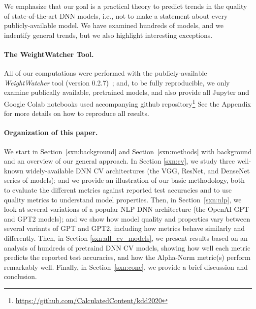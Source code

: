 \noindent
We emphasize that our goal is a practical theory to predict trends in the quality of state-of-the-art DNN models, i.e., not to make a statement about every publicly-available model.
We have examined hundreds of models, and we indentify general trends, but we also highlight interesting exceptions.

\paragraph{The WeightWatcher Tool.}

All of our computations were performed with the publicly-available \emph{WeightWatcher} tool (version 0.2.7)~\cite{weightwatcher_package};
and, to be fully reproducible, we only examine publically available, pretrained models, and
also provide all Jupyter and Google Colab notebooks used accompanying github 
repository\footnote{\url{https://github.com/CalculatedContent/kdd2020}
}
See the Appendix for more details on how to reproduce all results.


\paragraph{Organization of this paper.}

We start in Section~\ref{sxn:background} and Section~\ref{sxn:methods} with background and an overview of our general approach.
In Section \ref{sxn:cv}, we study three well-known widely-available DNN CV architectures (the VGG, ResNet, and DenseNet series of models); and we provide an illustration of our basic methodology, both to evaluate the different metrics against reported test accuracies and to use quality metrics to understand model properties.
Then, in Section~\ref{sxn:nlp}, we look at several variations of a popular NLP DNN architecture (the OpenAI GPT and GPT2 models); and we show how model quality and properties vary between several variants of GPT and GPT2, including how metrics behave similarly and differently.
Then, in Section \ref{sxn:all_cv_models}, we present results based on an analysis of hundreds of pretraind DNN CV models, showing how well each metric predicts the reported test accuracies, and how the Alpha-Norm metric(s) perform remarkably well.
Finally, in Section~\ref{sxn:conc}, we provide a brief discussion and conclusion.



